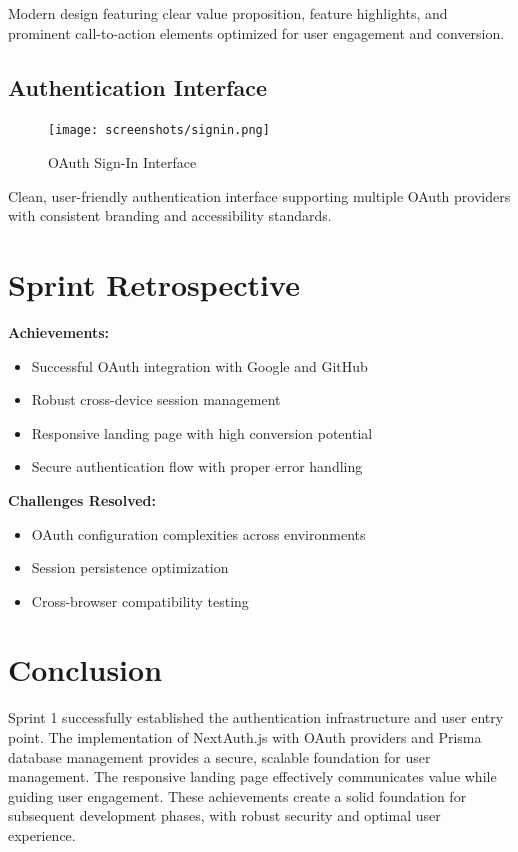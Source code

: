 Modern design featuring clear value proposition, feature highlights, and prominent call-to-action elements optimized for user engagement and conversion.

\subsection{Authentication Interface}
\begin{figure}[H]
    \centering
    \texttt{[image: screenshots/signin.png]}
    \caption{OAuth Sign-In Interface}
    \label{fig:signin_page}
\end{figure}

Clean, user-friendly authentication interface supporting multiple OAuth providers with consistent branding and accessibility standards.

\section{Sprint Retrospective}

\textbf{Achievements:}
\begin{itemize}
    \item Successful OAuth integration with Google and GitHub
    \item Robust cross-device session management
    \item Responsive landing page with high conversion potential
    \item Secure authentication flow with proper error handling
\end{itemize}

\textbf{Challenges Resolved:}
\begin{itemize}
    \item OAuth configuration complexities across environments
    \item Session persistence optimization
    \item Cross-browser compatibility testing
\end{itemize}

\section{Conclusion}

Sprint 1 successfully established the authentication infrastructure and user entry point. The implementation of NextAuth.js with OAuth providers and Prisma database management provides a secure, scalable foundation for user management. The responsive landing page effectively communicates value while guiding user engagement. These achievements create a solid foundation for subsequent development phases, with robust security and optimal user experience.